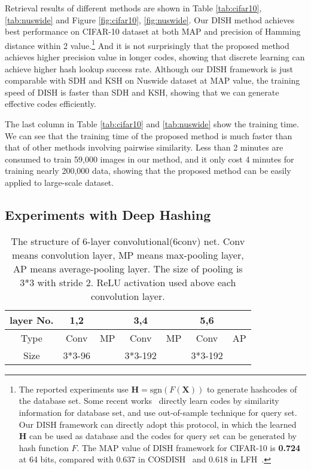 \documentclass[conference]{IEEEtran}
\begin{document}
Retrieval results of different methods are shown in Table \ref{tab:cifar10}, \ref{tab:nuswide} and Figure \ref{fig:cifar10}, \ref{fig:nuswide}. Our DISH method achieves best performance on CIFAR-10 dataset at both MAP and precision of Hamming distance within 2 value.\footnote{The  reported experiments use $\mathbf{H}=\mathrm{sgn}(F(\mathbf{X}))$ to generate hashcodes of the database set. Some recent works~\cite{kang2016column,zhang2014supervised} directly learn codes by similarity information for database set, and use out-of-sample technique for query set. Our DISH framework can directly adopt this protocol, in which the learned $\mathbf{H}$ can be used as database and the codes for query set can be generated by hash function $F$. The MAP value of DISH framework for CIFAR-10 is \textbf{0.724} at 64 bits, compared with 0.637 in COSDISH~\cite{kang2016column} and 0.618 in LFH~\cite{zhang2014supervised}.} And it is not surprisingly that the proposed method achieves higher precision value in longer codes, showing that discrete learning can achieve higher hash lookup success rate. Although our DISH framework is just comparable with SDH and KSH on Nuswide dataset at MAP value, the training speed of DISH is faster than SDH and KSH, showing that we can generate effective codes efficiently.

The last column in Table \ref{tab:cifar10} and \ref{tab:nuswide} show the training time. We can see that the training time of the proposed method is much faster than that of other methods involving pairwise similarity. Less than 2 minutes are consumed to train 59,000 images in our method, and it only cost 4 minutes for training nearly 200,000 data, showing that the proposed method can be easily applied to large-scale dataset.


\subsection{Experiments with Deep Hashing}
\label{subsec:deep}

\begin{table}[t]
    \centering
    \small
    \begin{tabular}{c|c|c|c|c|c|c}
    	\hline
    	layer No. & 1,2 & & 3,4 & & 5,6 & \\
        \hline
        Type & Conv & MP & Conv & MP & Conv & AP \\
        \hline
        Size & 3*3-96 & & 3*3-192 & & 3*3-192 & \\
        \hline
    \end{tabular}
    \caption{The structure of 6-layer convolutional(6conv) net. Conv means convolution layer, MP means max-pooling layer, AP means average-pooling layer. The size of pooling is 3*3 with stride 2. ReLU activation used above each convolution layer.}
    \label{tab:6conv}
\end{table}
\end{document}
